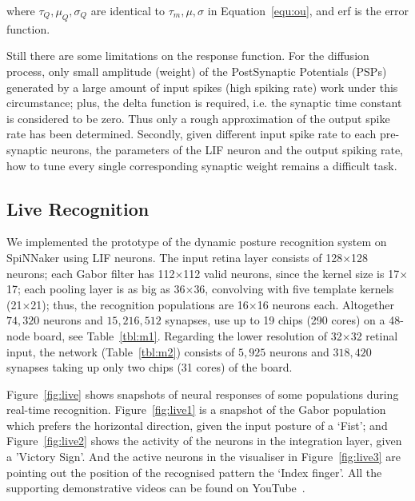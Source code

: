 where $\tau_Q, \mu_Q, \sigma_Q$ are identical to $\tau_m, \mu, \sigma$ in Equation~\ref{equ:ou}, and erf is the error function.

Still there are some limitations on the response function. 
For the diffusion process, only small amplitude (weight) of the PostSynaptic Potentials (PSPs) generated by a large amount of input spikes (high spiking rate) work under this circumstance; 
plus, the delta function is required, i.e. the synaptic time constant is considered to be zero. Thus only a rough approximation of the output spike rate has been determined.
Secondly, given different input spike rate to each pre-synaptic neurons, the parameters of the LIF neuron and the output spiking rate, how to tune every single corresponding synaptic weight remains a difficult task.


\subsection{Live Recognition}
We implemented the prototype of the dynamic posture recognition system on SpiNNaker using LIF neurons. 
The input retina layer consists of 128$\times$128 neurons; 
each Gabor filter has 112$\times$112 valid neurons, since the kernel size is 17$\times$17; 
each pooling layer is as big as 36$\times$36, convolving with five template kernels (21$\times$21); 
thus, the recognition populations are 16$\times$16 neurons each. Altogether $74,320$ neurons and $15,216,512$ synapses, use up to 19 chips (290 cores) on a 48-node board, see Table~\ref{tbl:m1}. Regarding the lower resolution of 32$\times$32 retinal input, the network (Table~\ref{tbl:m2}) consists of $5,925$ neurons and $318,420$ synapses taking up only two chips (31 cores) of the board.

Figure~\ref{fig:live} shows snapshots of neural responses of some populations during real-time recognition.
Figure~\ref{fig:live1} is a snapshot of the Gabor population which prefers the horizontal direction, given the input posture of a `Fist'; and Figure~\ref{fig:live2} shows the activity of the neurons in the integration layer, given a 'Victory Sign'.
And the active neurons in the visualiser in Figure~\ref{fig:live3} are pointing out the position of the recognised pattern the `Index finger'. 
All the supporting demonstrative videos can be found on YouTube~\cite{video1, video2, video3}. %

